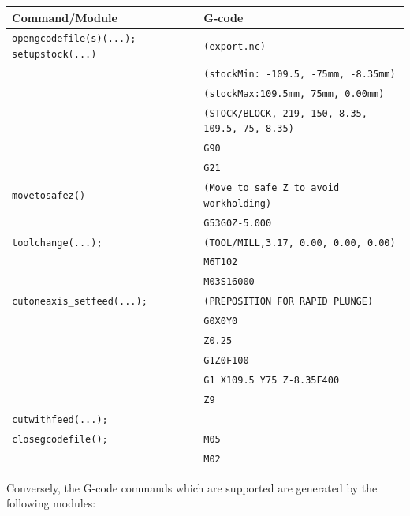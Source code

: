 \documentclass{ltxdoc}
\begin{document}
\noindent \begin{tabular}{@{}ll@{}} \toprule
 Command/Module                    & G-code                                        \\ \midrule
 \texttt{opengcodefile(s)(...);}
 \texttt{setupstock(...)}          & \texttt{(export.nc)}                          \\
                                   & \texttt{(stockMin: -109.5, -75mm, -8.35mm)}\\
                                   & \texttt{(stockMax:109.5mm, 75mm, 0.00mm)}\\
                                   & \texttt{(STOCK/BLOCK, 219, 150, 8.35, 109.5, 75, 8.35)}\\
                                   & \texttt{G90}\\
                                   & \texttt{G21} \\ \midrule
 \texttt{movetosafez()}            & \texttt{(Move to safe Z to avoid workholding)}\\
                                   & \texttt{G53G0Z-5.000}\\ \midrule
 \texttt{toolchange(...);}         & \texttt{(TOOL/MILL,3.17, 0.00, 0.00, 0.00)} \\
                                   & \texttt{M6T102} \\
                                   & \texttt{M03S16000} \\ \midrule
 \verb|cutoneaxis_setfeed(...);|   & \texttt{(PREPOSITION FOR RAPID PLUNGE)}\\
  & \texttt{G0X0Y0} \\
  & \texttt{Z0.25} \\
  & \texttt{G1Z0F100} \\
  & \texttt{G1 X109.5 Y75 Z-8.35F400} \\
  & \texttt{Z9}\\
 \texttt{cutwithfeed(...);}\\ \midrule

 \texttt{closegcodefile();}        & \texttt{M05}\\
                                   & \texttt{M02}\\ 
\bottomrule
\end{tabular}
\bigskip

\noindent Conversely, the G-code commands which are supported are generated by the following modules:

\bigskip
\end{document}
